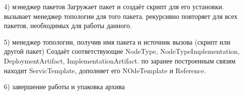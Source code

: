 4) мэнеджер пакетов
Загружает пакет и создаёт скрипт для его установки. вызывает менеджер топологии для того пакета. рекурсивно повторяет для всех пакетов, необходимых для работы данного. 

5) менеджер топологии, получив имя пакета и источник вызова (скрипт или другой пакет) 
Создаёт соответствующие NodeType, NodeTypeImplementation, DeploymentArtifact, ImplementationArtifact. 
по заранее построенным связям находит ServicTemplate, дополняет его NOdeTemplate и Reference. 

6) завершение работы и упаковка архива
	
\fi

